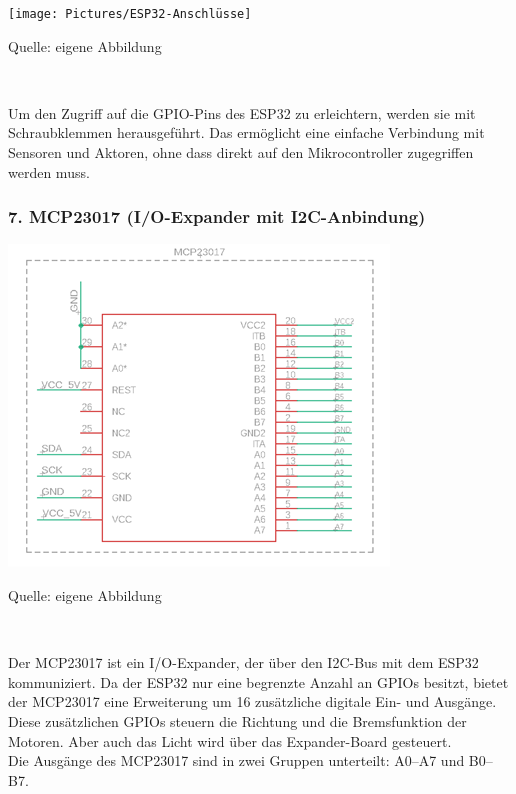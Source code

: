 \documentclass[ngerman,12pt,a4paper]{article}
\begin{document}
		\begin{center} 
			\begin{minipage}[t]{0.5\textwidth}
				\texttt{[image: Pictures/ESP32-Anschlüsse]}
				\label{fig: ESP32-Anschlüsse}
				\vspace{-10pt}
				\begin{center}
					\par\small Quelle: eigene Abbildung
				\end{center}
			\end{minipage} \\[0.75cm]
		\end{center}
		Um den Zugriff auf die GPIO-Pins des ESP32 zu erleichtern, werden sie mit Schraubklemmen herausgeführt. Das ermöglicht eine einfache Verbindung mit Sensoren und Aktoren, ohne dass direkt auf den Mikrocontroller zugegriffen werden muss.
		
		\subsubsection*{7. MCP23017 (I/O-Expander mit I2C-Anbindung)}
		
		\begin{center} 
			\begin{minipage}[t]{0.6\textwidth}
				\includegraphics{Pictures/MCP23017}
				\label{fig: MCP23017}
				\vspace{-10pt}
				\begin{center}
					\par\small Quelle: eigene Abbildung
				\end{center}
			\end{minipage} \\[0.75cm]
		\end{center}
		Der MCP23017 ist ein I/O-Expander, der über den I2C-Bus mit dem ESP32 kommuniziert. Da der ESP32 nur eine begrenzte Anzahl an GPIOs besitzt, bietet der MCP23017 eine Erweiterung um 16 zusätzliche digitale Ein- und Ausgänge. Diese zusätzlichen GPIOs steuern die Richtung und die Bremsfunktion der Motoren. Aber auch das Licht wird über das Expander-Board gesteuert.\\[0.5cm]
		Die Ausgänge des MCP23017 sind in zwei Gruppen unterteilt: A0–A7 und B0–B7.
		
\end{document}
